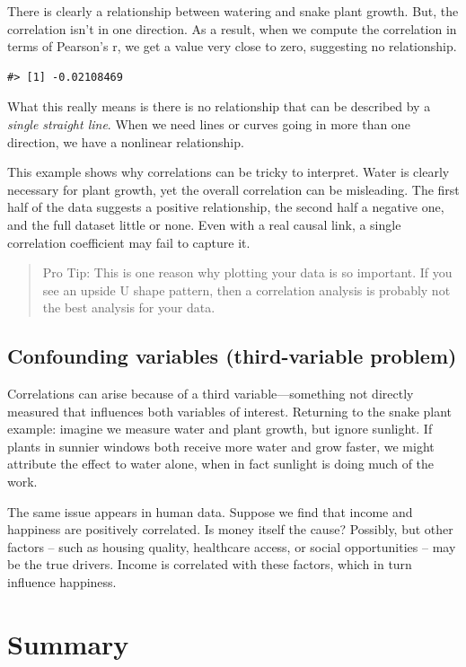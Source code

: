 \documentclass[
  letterpaper,
  DIV=11,
  numbers=noendperiod]{scrreprt}
\begin{document}
There is clearly a relationship between watering and snake plant growth.
But, the correlation isn't in one direction. As a result, when we
compute the correlation in terms of Pearson's r, we get a value very
close to zero, suggesting no relationship.

\begin{verbatim}
#> [1] -0.02108469
\end{verbatim}

What this really means is there is no relationship that can be described
by a \emph{single straight line}. When we need lines or curves going in
more than one direction, we have a nonlinear relationship.

This example shows why correlations can be tricky to interpret. Water is
clearly necessary for plant growth, yet the overall correlation can be
misleading. The first half of the data suggests a positive relationship,
the second half a negative one, and the full dataset little or none.
Even with a real causal link, a single correlation coefficient may fail
to capture it.

\begin{quote}
Pro Tip: This is one reason why plotting your data is so important. If
you see an upside U shape pattern, then a correlation analysis is
probably not the best analysis for your data.
\end{quote}

\subsection{Confounding variables (third-variable
problem)}\label{confounding-variables-third-variable-problem}

Correlations can arise because of a third variable---something not
directly measured that influences both variables of interest. Returning
to the snake plant example: imagine we measure water and plant growth,
but ignore sunlight. If plants in sunnier windows both receive more
water and grow faster, we might attribute the effect to water alone,
when in fact sunlight is doing much of the work.

The same issue appears in human data. Suppose we find that income and
happiness are positively correlated. Is money itself the cause?
Possibly, but other factors -- such as housing quality, healthcare
access, or social opportunities -- may be the true drivers. Income is
correlated with these factors, which in turn influence happiness.

\section{Summary}\label{summary-1}
\end{document}
